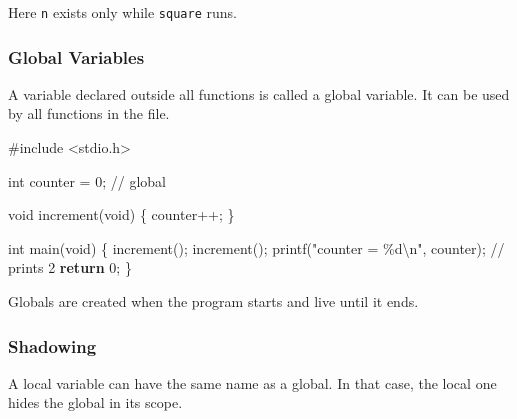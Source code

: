 \documentclass[
  letterpaper,
  DIV=11,
  numbers=noendperiod]{scrreprt}
\newenvironment{Shaded}{\begin{snugshade}}{\end{snugshade}}
\newcommand{\CommentTok}[1]{\textcolor[rgb]{0.37,0.37,0.37}{#1}}
\newcommand{\ControlFlowTok}[1]{\textcolor[rgb]{0.00,0.23,0.31}{\textbf{#1}}}
\newcommand{\DataTypeTok}[1]{\textcolor[rgb]{0.68,0.00,0.00}{#1}}
\newcommand{\DecValTok}[1]{\textcolor[rgb]{0.68,0.00,0.00}{#1}}
\newcommand{\ImportTok}[1]{\textcolor[rgb]{0.00,0.46,0.62}{#1}}
\newcommand{\NormalTok}[1]{\textcolor[rgb]{0.00,0.23,0.31}{#1}}
\newcommand{\OperatorTok}[1]{\textcolor[rgb]{0.37,0.37,0.37}{#1}}
\newcommand{\PreprocessorTok}[1]{\textcolor[rgb]{0.68,0.00,0.00}{#1}}
\newcommand{\SpecialCharTok}[1]{\textcolor[rgb]{0.37,0.37,0.37}{#1}}
\newcommand{\StringTok}[1]{\textcolor[rgb]{0.13,0.47,0.30}{#1}}
\begin{document}
Here \texttt{n} exists only while \texttt{square} runs.

\subsubsection{Global Variables}\label{global-variables}

A variable declared outside all functions is called a global variable.
It can be used by all functions in the file.

\begin{Shaded}
\begin{Highlighting}[]
\PreprocessorTok{\#include }\ImportTok{\textless{}stdio.h\textgreater{}}

\DataTypeTok{int}\NormalTok{ counter }\OperatorTok{=} \DecValTok{0}\OperatorTok{;}   \CommentTok{// global}

\DataTypeTok{void}\NormalTok{ increment}\OperatorTok{(}\DataTypeTok{void}\OperatorTok{)} \OperatorTok{\{}
\NormalTok{    counter}\OperatorTok{++;}
\OperatorTok{\}}

\DataTypeTok{int}\NormalTok{ main}\OperatorTok{(}\DataTypeTok{void}\OperatorTok{)} \OperatorTok{\{}
\NormalTok{    increment}\OperatorTok{();}
\NormalTok{    increment}\OperatorTok{();}
\NormalTok{    printf}\OperatorTok{(}\StringTok{"counter = }\SpecialCharTok{\%d\textbackslash{}n}\StringTok{"}\OperatorTok{,}\NormalTok{ counter}\OperatorTok{);}  \CommentTok{// prints 2}
    \ControlFlowTok{return} \DecValTok{0}\OperatorTok{;}
\OperatorTok{\}}
\end{Highlighting}
\end{Shaded}

Globals are created when the program starts and live until it ends.

\subsubsection{Shadowing}\label{shadowing}

A local variable can have the same name as a global. In that case, the
local one hides the global in its scope.
\end{document}
